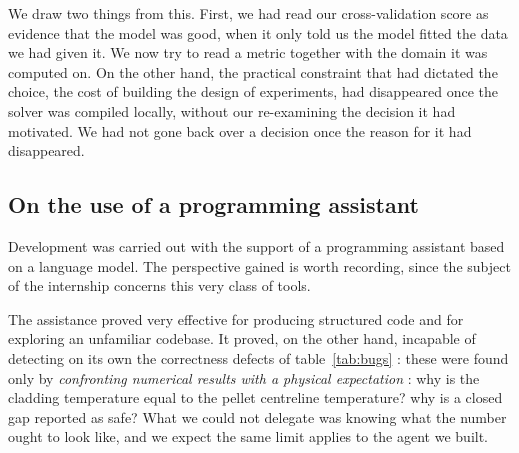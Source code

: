 We draw two things from this. First, we had read our cross-validation score as
evidence that the model was good, when it only told us the model fitted the data
we had given it. We now try to read a metric together with the domain it was
computed on. On the other hand, the practical
constraint that had dictated the choice, the cost of building the design of
experiments, had disappeared once the solver was compiled locally, without our
re-examining the decision it had motivated. We had not gone back over a
decision once the reason for it had disappeared.

\subsection{On the use of a programming assistant}

Development was carried out with the support of a programming assistant based on
a language model. The perspective gained is worth recording, since the subject
of the internship concerns this very class of tools.

The assistance proved very effective for producing structured code and for
exploring an unfamiliar codebase. It proved, on the other hand, incapable of
detecting on its own the correctness defects of table~\ref{tab:bugs} : these were
found only by \emph{confronting numerical results with a physical expectation} : why is the cladding temperature equal to the pellet centreline temperature? why
is a closed gap reported as safe? What we could not delegate was
knowing what the number ought to look like, and we expect the same limit applies
to the agent we built.

\clearpage
